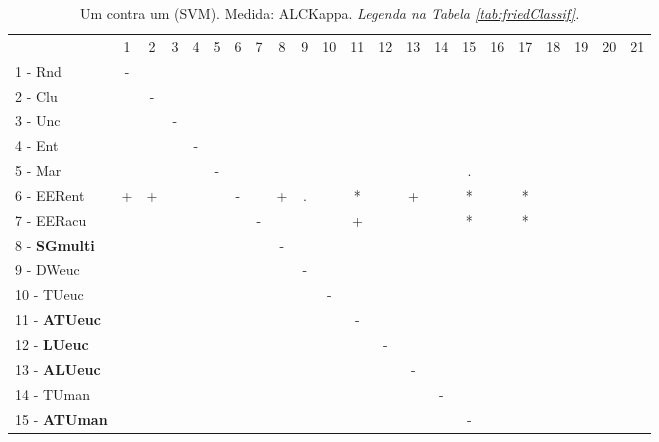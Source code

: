 \begin{table}[h]
\caption{Um contra um (SVM). Medida: ALCKappa. \textit{Legenda na Tabela \ref{tab:friedClassif}.}}
\begin{center}\begin{tabular}{lcc|cc|cc|cc|cc|cc|cc|cc|cc|cc|c}
 			& 1 & 2 & 3 & 4 & 5 & 6 & 7 & 8 & 9 & 10 & 11 & 12 & 13 & 14 & 15 & 16 & 17 & 18 & 19 & 20 & 21\\
1 - Rnd  	& - &   &   &   &   &   &   &   &   &   &   &   &   &   &   &   &   &   &   &   &   \\
2 - Clu  	&   & - &   &   &   &   &   &   &   &   &   &   &   &   &   &   &   &   &   &   &   \\ \hline
3 - Unc  	&   &   & - &   &   &   &   &   &   &   &   &   &   &   &   &   &   &   &   &   &   \\
4 - Ent  	&   &   &   & - &   &   &   &   &   &   &   &   &   &   &   &   &   &   &   &   &   \\ \hline
5 - Mar  	&   &   &   &   & - &   &   &   &   &   &   &   &   &   & . &   &   &   &   &   &   \\
6 - EERent	& + & + &   &   &   & - &   & + & . &   & * &   & + &   & * &   & * &   &   &   &   \\ \hline
7 - EERacu	&   &   &   &   &   &   & - &   &   &   & + &   &   &   & * &   & * &   &   &   &   \\
8 - \textbf{SGmulti}	&   &   &   &   &   &   &   & - &   &   &   &   &   &   &   &   &   &   &   &   &   \\ \hline
9 - DWeuc	&   &   &   &   &   &   &   &   & - &   &   &   &   &   &   &   &   &   &   &   &   \\
10 - TUeuc	&   &   &   &   &   &   &   &   &   & - &   &   &   &   &   &   &   &   &   &   &   \\ \hline
11 - \textbf{ATUeuc}	&   &   &   &   &   &   &   &   &   &   & - &   &   &   &   &   &   &   &   &   &   \\
12 - \textbf{LUeuc}	&   &   &   &   &   &   &   &   &   &   &   & - &   &   &   &   &   &   &   &   &   \\ \hline
13 - \textbf{ALUeuc}	&   &   &   &   &   &   &   &   &   &   &   &   & - &   &   &   &   &   &   &   &   \\
14 - TUman	&   &   &   &   &   &   &   &   &   &   &   &   &   & - &   &   &   &   &   &   &   \\ \hline
15 - \textbf{ATUman}	&   &   &   &   &   &   &   &   &   &   &   &   &   &   & - &   &   &   &   &   &   \\

\end{tabular}
\end{center}
\end{table}
